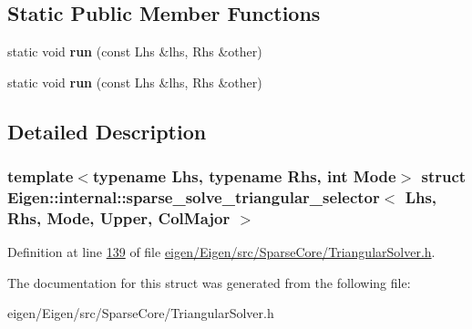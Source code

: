 \subsection*{Static Public Member Functions}
\begin{DoxyCompactItemize}
\item 
\mbox{\label{struct_eigen_1_1internal_1_1sparse__solve__triangular__selector_3_01_lhs_00_01_rhs_00_01_mode_00_01_upper_00_01_col_major_01_4_a4c3a8dbe6c8be51fdcf635336306dafa}} 
static void {\bfseries run} (const Lhs \&lhs, Rhs \&other)
\item 
\mbox{\label{struct_eigen_1_1internal_1_1sparse__solve__triangular__selector_3_01_lhs_00_01_rhs_00_01_mode_00_01_upper_00_01_col_major_01_4_a4c3a8dbe6c8be51fdcf635336306dafa}} 
static void {\bfseries run} (const Lhs \&lhs, Rhs \&other)
\end{DoxyCompactItemize}


\subsection{Detailed Description}
\subsubsection*{template$<$typename Lhs, typename Rhs, int Mode$>$\newline
struct Eigen\+::internal\+::sparse\+\_\+solve\+\_\+triangular\+\_\+selector$<$ Lhs, Rhs, Mode, Upper, Col\+Major $>$}



Definition at line \hyperlink{eigen_2_eigen_2src_2_sparse_core_2_triangular_solver_8h_source_l00139}{139} of file \hyperlink{eigen_2_eigen_2src_2_sparse_core_2_triangular_solver_8h_source}{eigen/\+Eigen/src/\+Sparse\+Core/\+Triangular\+Solver.\+h}.



The documentation for this struct was generated from the following file\+:\begin{DoxyCompactItemize}
\item 
eigen/\+Eigen/src/\+Sparse\+Core/\+Triangular\+Solver.\+h\end{DoxyCompactItemize}
